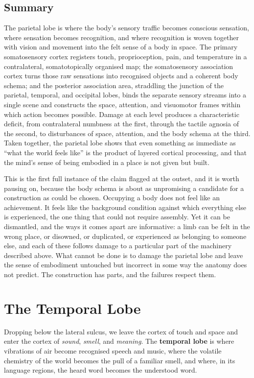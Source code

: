 \documentclass[11pt]{article}
\begin{document}
\subsection{Summary}

The parietal lobe is where the body's sensory traffic becomes conscious sensation, where sensation becomes recognition, and where recognition is woven together with vision and movement into the felt sense of a body in space. The primary somatosensory cortex registers touch, proprioception, pain, and temperature in a contralateral, somatotopically organised map; the somatosensory association cortex turns those raw sensations into recognised objects and a coherent body schema; and the posterior association area, straddling the junction of the parietal, temporal, and occipital lobes, binds the separate sensory streams into a single scene and constructs the space, attention, and visuomotor frames within which action becomes possible. Damage at each level produces a characteristic deficit, from contralateral numbness at the first, through the tactile agnosia of the second, to disturbances of space, attention, and the body schema at the third. Taken together, the parietal lobe shows that even something as immediate as ``what the world feels like'' is the product of layered cortical processing, and that the mind's sense of being embodied in a place is not given but built.

This is the first full instance of the claim flagged at the outset, and it is worth pausing on, because the body schema is about as unpromising a candidate for a construction as could be chosen. Occupying a body does not feel like an achievement. It feels like the background condition against which everything else is experienced, the one thing that could not require assembly. Yet it can be dismantled, and the ways it comes apart are informative: a limb can be felt in the wrong place, or disowned, or duplicated, or experienced as belonging to someone else, and each of these follows damage to a particular part of the machinery described above. What cannot be done is to damage the parietal lobe and leave the sense of embodiment untouched but incorrect in some way the anatomy does not predict. The construction has parts, and the failures respect them.

\section{The Temporal Lobe}

Dropping below the lateral sulcus, we leave the cortex of touch and space and enter the cortex of \textit{sound}, \textit{smell}, and \textit{meaning}. The \textbf{temporal lobe} is where vibrations of air become recognised speech and music, where the volatile chemistry of the world becomes the pull of a familiar smell, and where, in its language regions, the heard word becomes the understood word.
\end{document}

